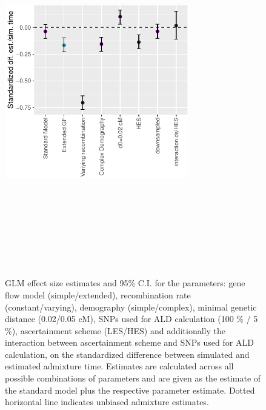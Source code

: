 \documentclass[11pt]{article}
\begin{document}
\begin{figure}
\centering
\includegraphics[width=8cm,height=16cm,keepaspectratio]{ATE_Revisions_files/figure-latex/fig3_2-1.pdf}
\caption{\label{fig:figS2_1} GLM effect size estimates and 95\% C.I. for the parameters: gene flow model (simple/extended), recombination rate (constant/varying), demography (simple/complex), minimal genetic distance (0.02/0.05 cM), SNPs used for ALD calculation (100 \% / 5 \%), ascertainment scheme (LES/HES) and additionally the interaction between ascertainment scheme and SNPs used for ALD calculation, on the standardized difference between simulated and estimated admixture time. Estimates are calculated across all possible combinations of parameters and are given as the estimate of the standard model plus the respective parameter estimate. Dotted horizontal line indicates unbiased admixture estimates.}
\end{figure}
\end{document}

